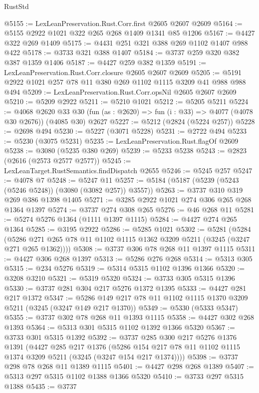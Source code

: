 \begin{lexlean}{RustStd}
\begin{coremodule}
@5155 := LexLeanPreservation.Rust.Corr.first @2605 @2607 @2609
@5164 := @5155 @2922 @1021 @322 @265 @268 @1409 @1341 @85 @1206
@5167 := @4427 @322 @269 @1409
@5175 := @4431 @251 @321 @388 @269 @1102 @1407 @988 @422
@5178 := @3733 @321 @388 @1407
@5184 := @3737 @259 @320 @382 @387 @1359 @1406
@5187 := @4427 @259 @382 @1359
@5191 := LexLeanPreservation.Rust.Corr.closure @2605 @2607 @2609
@5205 := @5191 @2922 @1021 @257 @78 @11 @380 @269 @1102 @1115 @3209 @41 @988 @988 @494
@5209 := LexLeanPreservation.Rust.Corr.opsNil @2605 @2607 @2609
@5210 := @5209 @2922
@5211 := @5210 @1021
@5212 := @5205 @5211
@5224 := @4068
    @2620
    @33
    @30
    (fun (as : @2620) => fun (i : @33) => @4077 (@4078 @30 @2676))
    (@4085 @30)
    @2627
@5227 := @5212 (@2824 (@5224 @257))
@5228 := @2698 @494
@5230 := @5227 (@3071 @5228)
@5231 := @2722 @494
@5233 := @5230 (@3075 @5231)
@5235 := LexLeanPreservation.Rust.flagOf @2609
@5238 := @3080 (@5235 @380 @269)
@5239 := @5233 @5238
@5243 := @2823 (@2616 (@2573 @2577 @2577))
@5245 := LexLeanTarget.RustSemantics.findDispatch @2655
@5246 := @5245 @257
@5247 := @4078 @7
@5248 := @5247 @11
@5257 := @5184 (@5187 (@5239 (@5243 (@5246 @5248)) (@3080 (@3082 @257)) @3557))
@5263 := @3737 @310 @319 @269 @386 @1398 @1405
@5271 := @3285 @2922 @1021 @274 @306 @265 @268 @1364 @1397
@5274 := @3737 @274 @308 @265
@5276 := @46 @268 @11
@5281 := @5274 @5276 @1364 (@1111 @1397 @1115)
@5284 := @4427 @274 @265 @1364
@5285 := @3195 @2922
@5286 := @5285 @1021
@5302 := @5281
    (@5284 (@5286 @271 @265 @78 @11 @1102 @1115 @1362 @3209 @5211 (@3245 (@3247 @271 @265 @1362))))
@5308 := @3737 @306 @78 @268 @11 @1397 @1115
@5311 := @4427 @306 @268 @1397
@5313 := @5286 @276 @268
@5314 := @5313 @305
@5315 := @234 @5276
@5319 := @5314 @5315 @1102 @1396 @1366
@5320 := @3208 @3210
@5321 := @5319 @5320
@5324 := @3733 @305 @5315 @1396
@5330 := @3737 @281 @304 @217 @5276 @1372 @1395
@5333 := @4427 @281 @217 @1372
@5347 := @5286 @149 @217 @78 @11 @1102 @1115 @1370 @3209 @5211 (@3245 (@3247 @149 @217 @1370))
@5349 := @5330 (@5333 @5347)
@5355 := @3737 @302 @78 @268 @11 @1393 @1115
@5358 := @4427 @302 @268 @1393
@5364 := @5313 @301 @5315 @1102 @1392 @1366 @5320
@5367 := @3733 @301 @5315 @1392
@5392 := @3737
    @285
    @300
    @217
    @5276
    @1376
    @1391
    (@4427
      @285
      @217
      @1376
      (@5286 @154 @217 @78 @11 @1102 @1115 @1374 @3209 @5211 (@3245 (@3247 @154 @217 @1374))))
@5398 := @3737 @298 @78 @268 @11 @1389 @1115
@5401 := @4427 @298 @268 @1389
@5407 := @5313 @297 @5315 @1102 @1388 @1366 @5320
@5410 := @3733 @297 @5315 @1388
@5435 := @3737

\end{coremodule}
\end{lexlean}
